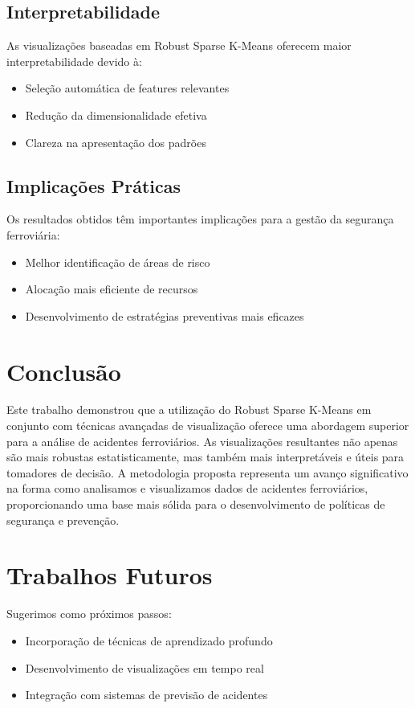 \documentclass[conference]{IEEEtran}
\begin{document}
\subsection{Interpretabilidade}
As visualizações baseadas em Robust Sparse K-Means oferecem maior interpretabilidade devido à:
\begin{itemize}
\item Seleção automática de features relevantes
\item Redução da dimensionalidade efetiva
\item Clareza na apresentação dos padrões
\end{itemize}

\subsection{Implicações Práticas}
Os resultados obtidos têm importantes implicações para a gestão da segurança ferroviária:
\begin{itemize}
\item Melhor identificação de áreas de risco
\item Alocação mais eficiente de recursos
\item Desenvolvimento de estratégias preventivas mais eficazes
\end{itemize}

\section{Conclusão}
Este trabalho demonstrou que a utilização do Robust Sparse K-Means em conjunto com técnicas avançadas de visualização oferece uma abordagem superior
para a análise de acidentes ferroviários. As visualizações resultantes não apenas são mais robustas estatisticamente, mas também mais interpretáveis
e úteis para tomadores de decisão. A metodologia proposta representa um avanço significativo na forma como analisamos e visualizamos dados
de acidentes ferroviários, proporcionando uma base mais sólida para o desenvolvimento de políticas de segurança e prevenção.

\section{Trabalhos Futuros}
Sugerimos como próximos passos:
\begin{itemize}
\item Incorporação de técnicas de aprendizado profundo
\item Desenvolvimento de visualizações em tempo real
\item Integração com sistemas de previsão de acidentes
\end{itemize}
\end{document}
